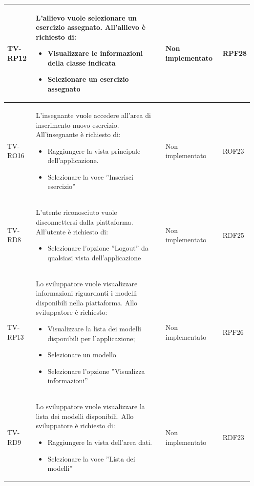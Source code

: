 \begin{longtable}{|>{\centering\arraybackslash}m{1.6cm}|>{\centering\arraybackslash}m{6.41cm}|>{\centering\arraybackslash}m{3.1cm} | >{\centering\arraybackslash}m{2.6cm}|}
		  \rowcolor{LightGray}
  TV-RP12 & L’allievo vuole selezionare un esercizio assegnato. All'allievo è richiesto di:
  \begin{itemize}
   \item Visualizzare le informazioni della classe indicata
   \item Selezionare un esercizio assegnato
  \end{itemize} & Non implementato & RPF28 \\ \hline

 TV-RO16 & L’insegnante vuole accedere all’area di inserimento nuovo esercizio. All'insegnante è richiesto di:
 \begin{itemize}
  \item Raggiungere la vista principale dell’applicazione.
  \item Selezionare la voce ”Inserisci esercizio”
 \end{itemize} & Non implementato & ROF23 \\ \hline
  \rowcolor{LightGray}
  TV-RD8 & L’utente riconosciuto vuole disconnettersi dalla piattaforma. All'utente è richiesto di:
  \begin{itemize}
   \item Selezionare l’opzione ”Logout” da qualsiasi vista dell'applicazione
  \end{itemize} & Non implementato & RDF25 \\ \hline
 
 TV-RP13 & Lo sviluppatore vuole visualizzare informazioni riguardanti i modelli disponibili nella piattaforma. Allo sviluppatore è richiesto:
 \begin{itemize}
  \item  Visualizzare la lista dei modelli disponibili per l’applicazione;
  \item Selezionare un modello
  \item Selezionare l’opzione ”Visualizza informazioni”
 \end{itemize} & Non implementato & RPF26 \\ \hline

\rowcolor{LightGray}
TV-RD9 & Lo sviluppatore vuole visualizzare la lista dei modelli disponibili.  Allo sviluppatore è richiesto di:

\begin{itemize}
 \item Raggiungere la vista dell’area dati.
 \item Selezionare la voce ”Lista dei modelli”
\end{itemize} & Non implementato & RDF23 \\ \hline


\end{longtable}
